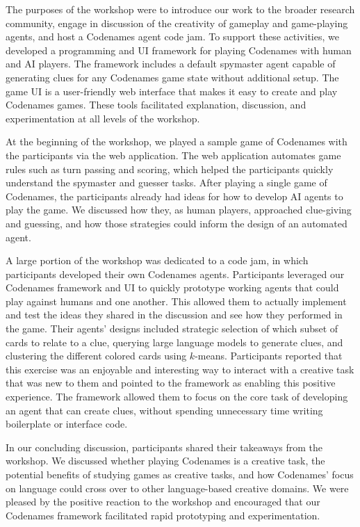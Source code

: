 \documentclass[phd,electronic,oneside,twosidetoc,letterpaper,chaptercenter,parttop,lof]{byumsphd}
\begin{document}
The purposes of the workshop were to introduce our work to the broader research community, engage in discussion of the creativity of gameplay and game-playing agents, and host a Codenames agent code jam. To support these activities, we developed a programming and UI framework for playing Codenames with human and AI players. The framework includes a default spymaster agent capable of generating clues for any Codenames game state without additional setup. The game UI is a user-friendly web interface that makes it easy to create and play Codenames games. These tools facilitated explanation, discussion, and experimentation at all levels of the workshop.

At the beginning of the workshop, we played a sample game of Codenames with the participants via the web application. The web application automates game rules such as turn passing and scoring, which helped the participants quickly understand the spymaster and guesser tasks. After playing a single game of Codenames, the participants already had ideas for how to develop AI agents to play the game. We discussed how they, as human players, approached clue-giving and guessing, and how those strategies could inform the design of an automated agent.

A large portion of the workshop was dedicated to a code jam, in which participants developed their own Codenames agents. Participants leveraged our Codenames framework and UI to quickly prototype working agents that could play against humans and one another. This allowed them to actually implement and test the ideas they shared in the discussion and see how they performed in the game. Their agents' designs included strategic selection of which subset of cards to relate to a clue, querying large language models to generate clues, and clustering the different colored cards using $k$-means. Participants reported that this exercise was an enjoyable and interesting way to interact with a creative task that was new to them and pointed to the framework as enabling this positive experience. The framework allowed them to focus on the core task of developing an agent that can create clues, without spending unnecessary time writing boilerplate or interface code.

In our concluding discussion, participants shared their takeaways from the workshop. We discussed whether playing Codenames is a creative task, the potential benefits of studying games as creative tasks, and how Codenames' focus on language could cross over to other language-based creative domains. We were pleased by the positive reaction to the workshop and encouraged that our Codenames framework facilitated rapid prototyping and experimentation.
\end{document}
